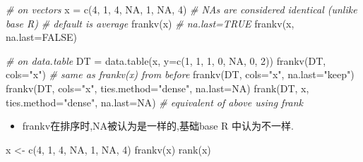 \documentclass[
]{book}
\newenvironment{Shaded}{\begin{snugshade}}{\end{snugshade}}
\newcommand{\AttributeTok}[1]{\textcolor[rgb]{0.77,0.63,0.00}{#1}}
\newcommand{\CommentTok}[1]{\textcolor[rgb]{0.56,0.35,0.01}{\textit{#1}}}
\newcommand{\ConstantTok}[1]{\textcolor[rgb]{0.00,0.00,0.00}{#1}}
\newcommand{\DecValTok}[1]{\textcolor[rgb]{0.00,0.00,0.81}{#1}}
\newcommand{\FunctionTok}[1]{\textcolor[rgb]{0.00,0.00,0.00}{#1}}
\newcommand{\NormalTok}[1]{#1}
\newcommand{\OtherTok}[1]{\textcolor[rgb]{0.56,0.35,0.01}{#1}}
\newcommand{\StringTok}[1]{\textcolor[rgb]{0.31,0.60,0.02}{#1}}
\providecommand{\tightlist}{%
  \setlength{\itemsep}{0pt}\setlength{\parskip}{0pt}}
\begin{document}
\begin{Shaded}
\begin{Highlighting}[]
\CommentTok{\# on vectors}
\NormalTok{x }\OtherTok{=} \FunctionTok{c}\NormalTok{(}\DecValTok{4}\NormalTok{, }\DecValTok{1}\NormalTok{, }\DecValTok{4}\NormalTok{, }\ConstantTok{NA}\NormalTok{, }\DecValTok{1}\NormalTok{, }\ConstantTok{NA}\NormalTok{, }\DecValTok{4}\NormalTok{)}
\CommentTok{\# NAs are considered identical (unlike base R)}
\CommentTok{\# default is average}
\FunctionTok{frankv}\NormalTok{(x) }\CommentTok{\# na.last=TRUE}
\FunctionTok{frankv}\NormalTok{(x, }\AttributeTok{na.last=}\ConstantTok{FALSE}\NormalTok{)}

\CommentTok{\# on data.table}
\NormalTok{DT }\OtherTok{=} \FunctionTok{data.table}\NormalTok{(x, }\AttributeTok{y=}\FunctionTok{c}\NormalTok{(}\DecValTok{1}\NormalTok{, }\DecValTok{1}\NormalTok{, }\DecValTok{1}\NormalTok{, }\DecValTok{0}\NormalTok{, }\ConstantTok{NA}\NormalTok{, }\DecValTok{0}\NormalTok{, }\DecValTok{2}\NormalTok{))}
\FunctionTok{frankv}\NormalTok{(DT, }\AttributeTok{cols=}\StringTok{"x"}\NormalTok{) }\CommentTok{\# same as frankv(x) from before}
\FunctionTok{frankv}\NormalTok{(DT, }\AttributeTok{cols=}\StringTok{"x"}\NormalTok{, }\AttributeTok{na.last=}\StringTok{"keep"}\NormalTok{)}
\FunctionTok{frankv}\NormalTok{(DT, }\AttributeTok{cols=}\StringTok{"x"}\NormalTok{, }\AttributeTok{ties.method=}\StringTok{"dense"}\NormalTok{, }\AttributeTok{na.last=}\ConstantTok{NA}\NormalTok{)}
\FunctionTok{frank}\NormalTok{(DT, x, }\AttributeTok{ties.method=}\StringTok{"dense"}\NormalTok{, }\AttributeTok{na.last=}\ConstantTok{NA}\NormalTok{) }\CommentTok{\# equivalent of above using frank}
\end{Highlighting}
\end{Shaded}

\begin{itemize}
\tightlist
\item
  frankv在排序时,NA被认为是一样的,基础base R 中认为不一样.
\end{itemize}

\begin{Shaded}
\begin{Highlighting}[]
\NormalTok{x }\OtherTok{\textless{}{-}}  \FunctionTok{c}\NormalTok{(}\DecValTok{4}\NormalTok{, }\DecValTok{1}\NormalTok{, }\DecValTok{4}\NormalTok{, }\ConstantTok{NA}\NormalTok{, }\DecValTok{1}\NormalTok{, }\ConstantTok{NA}\NormalTok{, }\DecValTok{4}\NormalTok{) }
\FunctionTok{frankv}\NormalTok{(x)}
\FunctionTok{rank}\NormalTok{(x)}
\end{Highlighting}
\end{Shaded}
\end{document}
